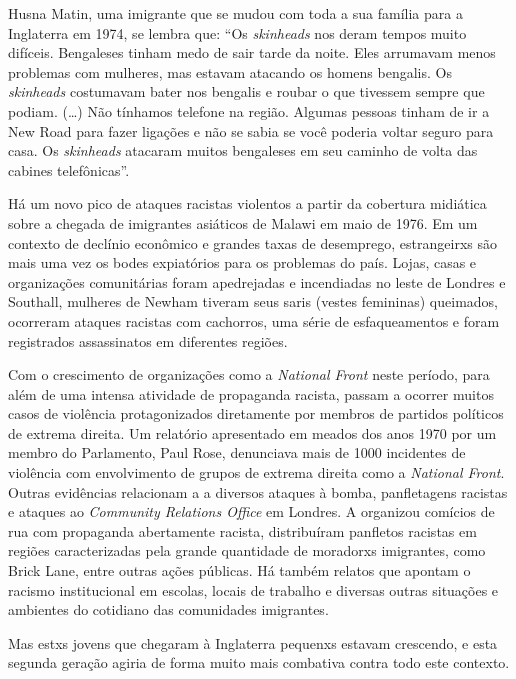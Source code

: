 Husna Matin, uma imigrante que se mudou com toda a sua família para a Inglaterra em 1974, se lembra que: ``Os \emph{skinheads} nos deram tempos muito difíceis. Bengaleses tinham medo de sair tarde da noite. Eles arrumavam menos problemas com mulheres, mas estavam atacando os homens bengalis. Os \emph{skinheads} costumavam bater nos bengalis e roubar o que tivessem sempre que podiam. (\ldots{}) Não tínhamos telefone na região. Algumas pessoas tinham de ir a New Road para fazer ligações e não se sabia se você poderia voltar seguro para casa. Os \emph{skinheads} atacaram muitos bengaleses em seu caminho de volta das cabines telefônicas''.

Há um novo pico de ataques racistas violentos a partir da cobertura midiática sobre a chegada de imigrantes asiáticos de Malawi em maio de 1976. Em um contexto de declínio econômico e grandes taxas de desemprego, estrangeirxs são mais uma vez os bodes expiatórios para os problemas do país. Lojas, casas e organizações comunitárias foram apedrejadas e incendiadas no leste de Londres e Southall, mulheres de Newham tiveram seus saris (vestes femininas) queimados, ocorreram ataques racistas com cachorros, uma série de esfaqueamentos e foram registrados assassinatos em diferentes regiões.

Com o crescimento de organizações como a \emph{National Front} neste período, para além de uma intensa atividade de propaganda racista, passam a ocorrer muitos casos de violência protagonizados diretamente por membros de partidos políticos de extrema direita. Um relatório apresentado em meados dos anos 1970 por um membro do Parlamento, Paul Rose, denunciava mais de 1000 incidentes de violência com envolvimento de grupos de extrema direita como a \emph{National Front}. Outras evidências relacionam a  a diversos ataques à bomba, panfletagens racistas e ataques ao \emph{Community Relations Office} em Londres. A  organizou comícios de rua com propaganda abertamente racista, distribuíram panfletos racistas em regiões caracterizadas pela grande quantidade de moradorxs imigrantes, como Brick Lane, entre outras ações públicas. Há também relatos que apontam o racismo institucional em escolas, locais de trabalho e diversas outras situações e ambientes do cotidiano das comunidades imigrantes.

Mas estxs jovens que chegaram à Inglaterra pequenxs estavam crescendo, e esta segunda geração agiria de forma muito mais combativa contra todo este contexto.

